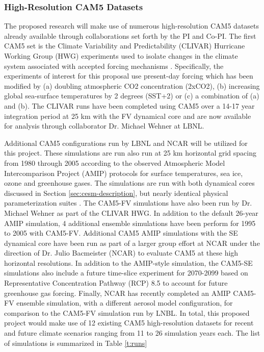 \documentclass[11pt]{article}
\begin{document}
\subsubsection{High-Resolution CAM5 Datasets} \label{sec:CAM-data} 

The proposed research will make use of numerous high-resolution CAM5 datasets already available through collaborations set forth by the PI and Co-PI. The first CAM5 set is the Climate Variability and Predictability (CLIVAR) Hurricane Working Group (HWG) experiments used to isolate changes in the climate system associated with accepted forcing mechanisms \citep{Wehner2015}.  Specifically, the experiments of interest for this proposal use present-day forcing which has been modified by (a) doubling atmospheric CO2 concentration (2xCO2), (b) increasing global sea-surface temperatures by 2 degrees (SST+2) or (c) a combination of (a) and (b).  The CLIVAR runs have been completed using CAM5 over a 14-17 year integration period at 25 km with the FV dynamical core and are now available for analysis through collaborator Dr. Michael Wehner at LBNL.

Additional CAM5 configurations run by LBNL and NCAR will be utilized for this project. These simulations are run also run at 25 km horizontal grid spacing from 1980 through 2005 according to the observed Atmospheric Model Intercomparison Project (AMIP) protocols \citep{Gates1992,Gates1999} for surface temperatures, sea ice, ozone and greenhouse gases. The simulations are run with both dynamical cores discussed in Section \ref{sec:cesm-description}, but nearly identical physical parameterization suites \citep{RBNetal2010NCAR}. The CAM5-FV simulations have also been run by Dr. Michael Wehner as part of the CLIVAR HWG. In addition to the default 26-year AMIP simulation, 4 additional ensemble simulations have been perform for 1995 to 2005 with CAM5-FV. Additional CAM5 AMIP simulations with the SE dynamical core have been run as part of a larger group effort at NCAR under the direction of Dr. Julio Bacmeister (NCAR) to evaluate CAM5 at these high horizontal resolutions. In addition to the AMIP-style simulation, the CAM5-SE simulations also include a future time-slice experiment for 2070-2099 based on Representative Concentration Pathway (RCP) 8.5 to account for future greenhouse gas forcing. Finally, NCAR has recently completed an AMIP CAM5-FV ensemble simulation, with a different aerosol model configuration, for comparison to the CAM5-FV simulation run by LNBL.  In total, this proposed project would make use of 12 existing CAM5 high-resolution datasets for recent and future climate scenarios ranging from 11 to 26 simulation years each.  The list of simulations is summarized in Table \ref{t:runs}
\end{document}

